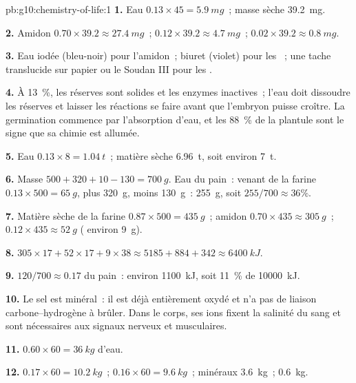 \begin{solution}{pb:g10:chemistry-of-life:1}
\textbf{1.} Eau $0.13 \times 45 = \qty{5.9}{mg}$~; masse sèche
\qty{39.2}{mg}.

\textbf{2.} Amidon $0.70 \times 39.2 \approx \qty{27.4}{mg}$~;
 $0.12 \times 39.2 \approx \qty{4.7}{mg}$~;  $0.02 \times 39.2
\approx \qty{0.8}{mg}$.

\textbf{3.} Eau iodée (bleu-noir) pour l'amidon~; biuret (violet) pour
les ~; une tache translucide sur papier ou le Soudan III pour
les .

\textbf{4.} À 13~\%, les réserves sont solides et les enzymes
inactives~; l'eau doit dissoudre les réserves et laisser les réactions
se faire avant que l'embryon puisse croître. La germination commence
par l'absorption d'eau, et les 88~\% de la plantule sont le signe que
sa chimie est allumée.

\textbf{5.} Eau $0.13 \times 8 = \qty{1.04}{t}$~; matière sèche
\qty{6.96}{t}, soit environ \qty{7}{t}.

\textbf{6.} Masse $500 + 320 + 10 - 130 = \qty{700}{g}$. Eau du pain~:
venant de la farine $0.13 \times 500 = \qty{65}{g}$, plus \qty{320}{g},
moins \qty{130}{g}~: \qty{255}{g}, soit $255/700 \approx 36\%$.

\textbf{7.} Matière sèche de la farine $0.87 \times 500 = \qty{435}{g}$~;
amidon $0.70 \times 435 \approx \qty{305}{g}$~;  $0.12 \times 435 \approx
\qty{52}{g}$ ( environ \qty{9}{g}).

\textbf{8.} $305 \times 17 + 52 \times 17 + 9 \times 38 \approx 5185 +
884 + 342 \approx \qty{6400}{kJ}$.

\textbf{9.} $120/700 \approx 0.17$ du pain~: environ \qty{1100}{kJ},
soit 11~\% de \qty{10000}{kJ}.

\textbf{10.} Le sel est minéral~: il est déjà entièrement oxydé et n'a
pas de liaison carbone--hydrogène à brûler. Dans le corps, ses ions
fixent la salinité du sang et sont nécessaires aux signaux nerveux et
musculaires.

\textbf{11.} $0.60 \times 60 = \qty{36}{kg}$ d'eau.

\textbf{12.}  $0.17 \times 60 = \qty{10.2}{kg}$~;  $0.16
\times 60 = \qty{9.6}{kg}$~; minéraux \qty{3.6}{kg}~; 
\qty{0.6}{kg}.


\end{solution}
